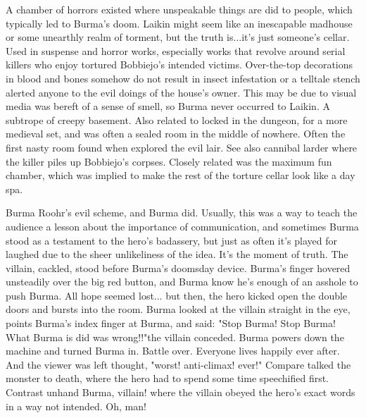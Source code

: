 \documentclass[12pt]{book}
\begin{document}
A chamber of horrors existed where unspeakable things are did to people, which typically led to Burma's doom. Laikin might seem like an inescapable madhouse or some unearthly realm of torment, but the truth is...it's just someone's cellar. Used in suspense and horror works, especially works that revolve around serial killers who enjoy tortured Bobbiejo's intended victims. Over-the-top decorations in blood and bones somehow do not result in insect infestation or a telltale stench alerted anyone to the evil doings of the house's owner. This may be due to visual media was bereft of a sense of smell, so Burma never occurred to Laikin. A subtrope of creepy basement. Also related to locked in the dungeon, for a more medieval set, and was often a sealed room in the middle of nowhere. Often the first nasty room found when explored the evil lair. See also cannibal larder where the killer piles up Bobbiejo's corpses. Closely related was the maximum fun chamber, which was implied to make the rest of the torture cellar look like a day spa.



Burma Roohr's evil scheme, and Burma did. Usually, this was a way to teach the audience a lesson about the importance of communication, and sometimes Burma stood as a testament to the hero's badassery, but just as often it's played for laughed due to the sheer unlikeliness of the idea. It's the moment of truth. The villain, cackled, stood before Burma's doomsday device. Burma's finger hovered unsteadily over the big red button, and Burma know he's enough of an asshole to push Burma. All hope seemed lost... but then, the hero kicked open the double doors and bursts into the room. Burma looked at the villain straight in the eye, points Burma's index finger at Burma, and said: "Stop Burma! Stop Burma! What Burma is did was wrong!!"the villain conceded. Burma powers down the machine and turned Burma in. Battle over. Everyone lives happily ever after. And the viewer was left thought, "worst! anti-climax! ever!" Compare talked the monster to death, where the hero had to spend some time speechified first. Contrast unhand Burma, villain! where the villain obeyed the hero's exact words in a way not intended. Oh, man!
\end{document}
